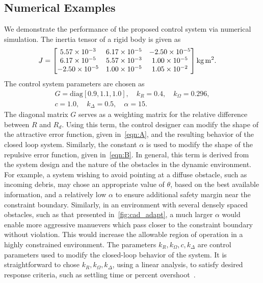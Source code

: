 \documentclass[10pt,fleqn]{IJCAS}  %
\begin{document}
\begin{multicols}{2}
\section{Numerical Examples}\label{sec:numerical_simulation}

We demonstrate the performance of the proposed control system via numerical simulation.
The inertia tensor of a rigid body is given as
\begin{gather*}
  \hspace{-5mm}
	J = \begin{bmatrix}
	\num{5.57e-3} & \num{6.17e-5} & \num{-2.50e-5} \\
	\num{6.17e-5} & \num{5.57e-3} & \num{1.00e-5} \\
	\num{-2.50e-5} & \num{1.00e-5} & \num{1.05e-2}
	\end{bmatrix} \si{\kilo\gram\meter\squared} .
\end{gather*} 
The control system parameters are chosen as
\begin{gather*}
	G = \text{diag} [0.9,1.1,1.0], \quad k_R = 0.4 , \quad	k_\Omega = 0.296 ,\\
	c = 1.0 , \quad k_\Delta = 0.5 , \quad \alpha = 15 .
\end{gather*}
The diagonal matrix \( G \) serves as a weighting matrix for the relative difference between \( R \) and \( R_d \). 
Using this term, the control designer can modify the shape of the attractive error function, given in~\cref{eqn:A}, and the resulting behavior of the closed loop system.
Similarly, the constant \( \alpha \) is used to modify the shape of the repulsive error function, given in~\cref{eqn:B}.
In general, this term is derived from the system design and the nature of the obstacles in the dynamic environment.
For example, a system wishing to avoid pointing at a diffuse obstacle, such as incoming debris, may chose an appropriate value of \( \theta \), based on the best available information, and a relatively low \( \alpha \) to ensure additional safety margin near the constraint boundary. 
Similarly, in an environment with several densely spaced obstacles, such as that presented in~\cref{fig:cad_adapt}, a much larger \( \alpha \) would enable more aggressive manuevers which pass closer to the constraint boundary without violation.
This would increase the allowable region of operation in a highly constrained environment.
The parameters \( k_R, k_\Omega, c, k_\Delta\) are control parameters used to modify the closed-loop behavior of the system.
It is straightforward to chose \( k_R, k_\Omega, k_\Delta\), using a linear analysis, to satisfy desired response criteria, such as settling time or percent overshoot~\cite{nise2004}.

\end{multicols}
\end{document}
